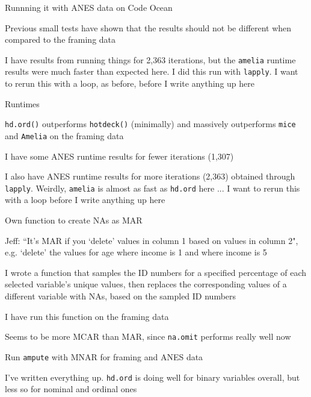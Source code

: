 \documentclass[12pt]{article}
\begin{document}
\begin{coi}
\begin{coi}
			\end{coi}
		\item Runnning it with ANES data on Code Ocean
			\begin{coi}
				\item Previous small tests have shown that the results should not be different when compared to the framing data
				\item I have results from running things for 2,363 iterations, but the \texttt{amelia} runtime results were much faster than expected here. I did this run with \texttt{lapply}. I want to rerun this with a loop, as before, before I write anything up here
			\end{coi}
		\item Runtimes
			\begin{coi}
				\item \texttt{hd.ord()} outperforms \texttt{hotdeck()} (minimally) and massively outperforms \texttt{mice} and \texttt{Amelia} on the framing data
				\item I have some ANES runtime results for fewer iterations (1,307)
				\item I also have ANES runtime results for more iterations (2,363) obtained through \texttt{lapply}. Weirdly, \texttt{amelia} is almost as fast as \texttt{hd.ord} here ... I want to rerun this with a loop before I write anything up here
			\end{coi}
		\item Own function to create NAs as MAR
			\begin{coi}
				\item Jeff: ``It's MAR if you `delete' values in column 1 based on values in column 2", e.g. `delete' the values for age where income is 1 and where income is 5
				\item I wrote a function that samples the ID numbers for a specified percentage of each selected variable's unique values, then replaces the corresponding values of a different variable with NAs, based on the sampled ID numbers
				\item I have run this function on the framing data
				\item Seems to be more MCAR than MAR, since \texttt{na.omit} performs really well now
			\end{coi}
		\item Run \texttt{ampute} with MNAR for framing and ANES data
			\begin{coi}
				\item I've written everything up. \texttt{hd.ord} is doing well for binary variables overall, but less so for nominal and ordinal ones

\end{coi}
\end{coi}
\end{document}
